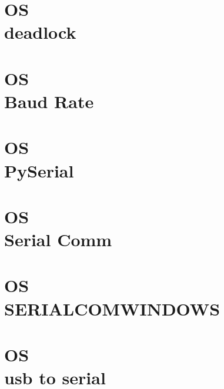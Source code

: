 \documentclass{wileySix}
\begin{document}
\chapter[DeadLock]
{OS\\ deadlock}



\chapter[Baudrate]
{OS\\ Baud Rate}


\chapter[PySerial]
{OS\\ PySerial}


\chapter[Serial Communication di Linux]
{OS\\ Serial Comm}


\chapter[SERIALCOMWINDOWS]
{OS\\ SERIALCOMWINDOWS}


\chapter[usb to serial]
{OS\\ usb to serial}


%

%

%
\end{document}

